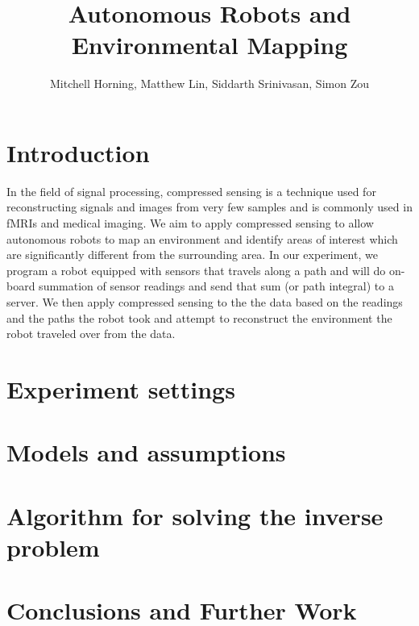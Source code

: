 \documentclass[english]{article}\usepackage[]{graphicx}\usepackage[]{color}
\begin{document}
\title{Autonomous Robots and Environmental Mapping}

\author{Mitchell Horning, Matthew Lin, Siddarth Srinivasan, Simon Zou}

\maketitle

\tableofcontents

\section{Introduction}

In the field of signal processing, compressed sensing is a technique used for reconstructing signals and images from very few samples and is commonly used in fMRIs and medical imaging. We aim to apply compressed sensing to allow autonomous robots to map an environment and identify areas of interest which are significantly different from the surrounding area. In our experiment, we  program a robot equipped with sensors that travels along a path and will do on-board summation of sensor readings and send that sum (or path integral) to a server. We then apply compressed sensing to the the data based on the readings and the paths the robot took and attempt to reconstruct the environment the robot traveled over from the data. 


\section{Experiment settings}

\section{Models and assumptions}

\section{Algorithm for solving the inverse problem}

\section{Conclusions and Further Work}
\end{document}
